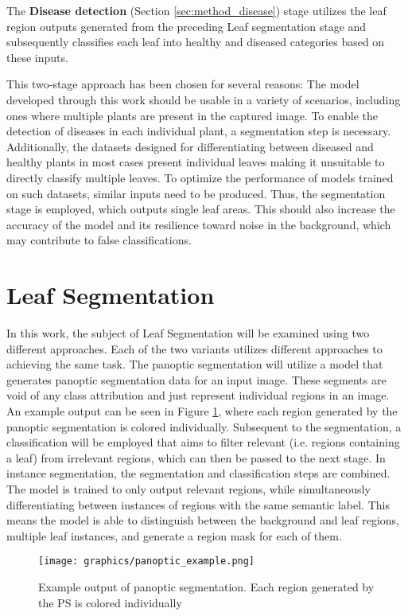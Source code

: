 \documentclass[draft,final]{vutinfth} %
\begin{document}
The \textbf{Disease detection} (Section \ref{sec:method_disease}) stage utilizes the leaf region outputs generated from the preceding Leaf segmentation stage and subsequently classifies each leaf into healthy and diseased categories based on these inputs.

This two-stage approach has been chosen for several reasons: The model developed through this work should be usable in a variety of scenarios, including ones where multiple plants are present in the captured image. To enable the detection of diseases in each individual plant, a segmentation step is necessary. Additionally, the datasets designed for differentiating between diseased and healthy plants in most cases present individual leaves making it unsuitable to directly classify multiple leaves. To optimize the performance of models trained on such datasets, similar inputs need to be produced. Thus, the segmentation stage is employed, which outputs single leaf areas. This should also increase the accuracy of the model and its resilience toward noise in the background, which may contribute to false classifications.

\section{Leaf Segmentation} \label{sec:method_segmentation}

In this work, the subject of Leaf Segmentation will be examined using two different approaches. Each of the two variants utilizes different approaches to achieving the same task. The panoptic segmentation will utilize a model that generates panoptic segmentation data for an input image. These segments are void of any class attribution and just represent individual regions in an image. An example output can be seen in Figure \ref{fig:panoptic_example}, where each region generated by the panoptic segmentation is colored individually. Subsequent to the segmentation, a classification will be employed that aims to filter relevant (i.e. regions containing a leaf) from irrelevant regions, which can then be passed to the next stage.
In instance segmentation, the segmentation and classification steps are combined. The model is trained to only output relevant regions, while simultaneously differentiating between instances of regions with the same semantic label. This means the model is able to distinguish between the background and leaf regions, multiple leaf instances, and generate a region mask for each of them.

\begin{figure}
    \centering
    \texttt{[image: graphics/panoptic\_example.png]}
    \caption{Example output of panoptic segmentation. Each region generated by the PS is colored individually}
    \label{fig:panoptic_example}
\end{figure}
\end{document}
